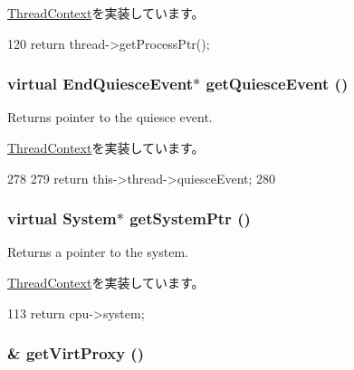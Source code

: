 \hyperlink{classThreadContext_a8725d0e5dce89a4a086c7de4bb9d4454}{ThreadContext}を実装しています。


\begin{DoxyCode}
120 { return thread->getProcessPtr(); }
\end{DoxyCode}
\hypertarget{classO3ThreadContext_abe1122860803a2563325469d9d41f47a}{
\subsubsection[{getQuiesceEvent}]{\setlength{\rightskip}{0pt plus 5cm}virtual {\bf EndQuiesceEvent}$\ast$ getQuiesceEvent ()}}
\label{classO3ThreadContext_abe1122860803a2563325469d9d41f47a}
Returns pointer to the quiesce event. 

\hyperlink{classThreadContext_ace05cbb8c4644ab69ad2ce815a259669}{ThreadContext}を実装しています。


\begin{DoxyCode}
278     {
279         return this->thread->quiesceEvent;
280     }
\end{DoxyCode}
\hypertarget{classO3ThreadContext_a8ff008929430425aaac3dc6f718be62c}{
\subsubsection[{getSystemPtr}]{\setlength{\rightskip}{0pt plus 5cm}virtual {\bf System}$\ast$ getSystemPtr ()}}
\label{classO3ThreadContext_a8ff008929430425aaac3dc6f718be62c}
Returns a pointer to the system. 

\hyperlink{classThreadContext_a4585cb7174e215741001b70fafe6662e}{ThreadContext}を実装しています。


\begin{DoxyCode}
113 { return cpu->system; }
\end{DoxyCode}
\hypertarget{classO3ThreadContext_a03a07ebd804051b18b69156c2fff36a3}{
\subsubsection[{getVirtProxy}]{ \& getVirtProxy ()}}
\label{classO3ThreadContext_a03a07ebd804051b18b69156c2fff36a3}


